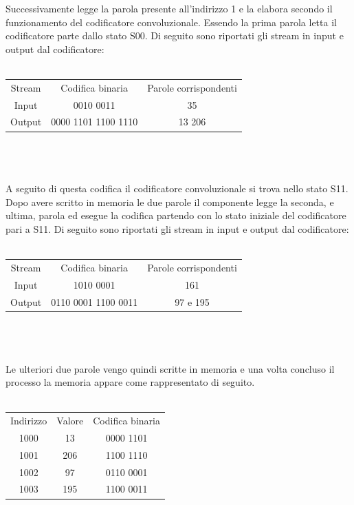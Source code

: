 \documentclass{article}
\begin{document}
Successivamente legge la parola presente all'indirizzo 1 e la elabora secondo il funzionamento del codificatore convoluzionale.  Essendo la prima parola letta il codificatore parte dallo stato S00. Di seguito sono riportati gli stream in input e output dal codificatore: 
\\
\\
\begin{tabular}{c c c}
	Stream & Codifica binaria & Parole corrispondenti \\
	Input &  0010 0011 & 35 \\
	Output & 0000 1101  1100 1110& 13 206 \\
\end{tabular}
\\
\\
\\
A seguito di questa codifica il codificatore convoluzionale si trova nello stato S11. Dopo avere scritto in memoria le due parole il componente legge la seconda, e ultima, parola ed esegue la codifica partendo con lo stato iniziale del codificatore pari a S11. Di seguito sono riportati gli stream in input e output dal codificatore: 
\\
\\
\begin{tabular}{c c c}
	Stream & Codifica binaria & Parole corrispondenti \\
	Input & 1010 0001 & 161 \\
	Output & 0110 0001 1100 0011 & 97 e 195 \\
\end{tabular}
\\
\\
\\
Le ulteriori due parole vengo quindi scritte in memoria e una volta concluso il processo la memoria appare come rappresentato di seguito.
\\
\\
\begin{tabular}{c c c}
	Indirizzo & Valore & Codifica binaria \\
	1000 & 13 & 0000 1101 \\
	1001 & 206 & 1100 1110 \\
	1002 & 97 & 0110 0001 \\
	1003 & 195 & 1100 0011 \\
\end{tabular}
\\
\\
\end{document}
